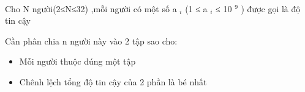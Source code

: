  

Cho N người(2≤N≤32) ,mỗi người có một số a $_ i $ (1 ≤ a $_ i $ ≤ 10 $^ 9 $ ) được gọi là độ tin cậy

Cần phân chia n người này vào 2 tập sao cho:
\begin{itemize}
	\item Mỗi người thuộc đúng một tập
	\item Chênh lệch tổng độ tin cậy của 2 phần là bé nhất
\end{itemize}